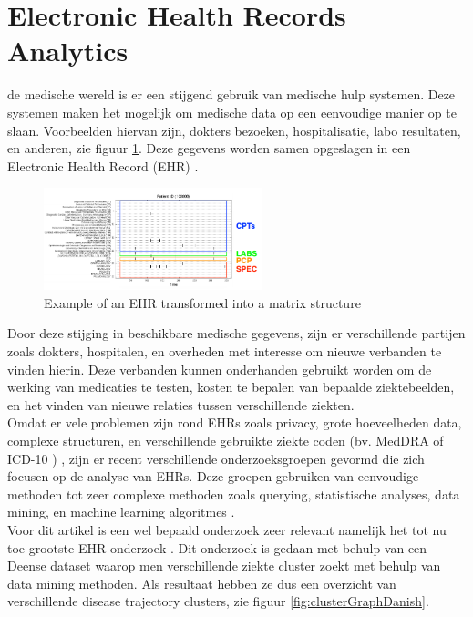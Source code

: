 \documentclass[11pt, final, journal, twoside, a4paper]{IEEEtran}
\begin{document}
\section{Electronic Health Records Analytics}

 de medische wereld is er een stijgend gebruik van medische hulp systemen. Deze systemen maken het mogelijk om medische data op een eenvoudige manier op te slaan. Voorbeelden hiervan zijn, dokters bezoeken, hospitalisatie, labo resultaten, en anderen, zie figuur \ref{fig:matrixPatient}. Deze gegevens worden samen opgeslagen in een Electronic Health Record (EHR) \cite{EHRworld:article}. \\

\begin{figure}[!htb]
	\centering
	\includegraphics[width=2.5in]{matrixPatient.png}
	\caption{Example of an EHR transformed into a matrix structure \cite{EHRrecommender:article}}
	\label{fig:matrixPatient}
\end{figure}

Door deze stijging in beschikbare medische gegevens, zijn er verschillende partijen zoals dokters, hospitalen, en overheden met interesse om nieuwe verbanden te vinden hierin. Deze verbanden kunnen onderhanden gebruikt worden om de werking van medicaties te testen, kosten te bepalen van bepaalde ziektebeelden, en het vinden van nieuwe relaties tussen verschillende ziekten. \\
Omdat er vele problemen zijn rond EHRs zoals privacy, grote hoeveelheden data, complexe structuren, en verschillende gebruikte ziekte coden (bv. MedDRA \cite{MedDRA:online} of ICD-10 \cite{MedDRA:online}) , zijn er recent verschillende onderzoeksgroepen gevormd die zich focusen op de analyse van EHRs. Deze groepen gebruiken van eenvoudige methoden tot zeer complexe methoden zoals querying, statistische analyses, data mining, en machine learning algoritmes \cite{EHRbigdata:slides} \cite{EHRquery:journal} \cite{EHRrecommender:article} \cite{EHRmining:article}. \\

Voor dit artikel is een wel bepaald onderzoek zeer relevant namelijk het tot nu toe grootste EHR onderzoek \cite{Brunak:article}. Dit onderzoek is gedaan met behulp van een Deense dataset waarop men verschillende ziekte cluster zoekt met behulp van data mining methoden. Als resultaat hebben ze dus een overzicht van verschillende disease trajectory clusters, zie figuur \ref{fig:clusterGraphDanish}.
\end{document}
